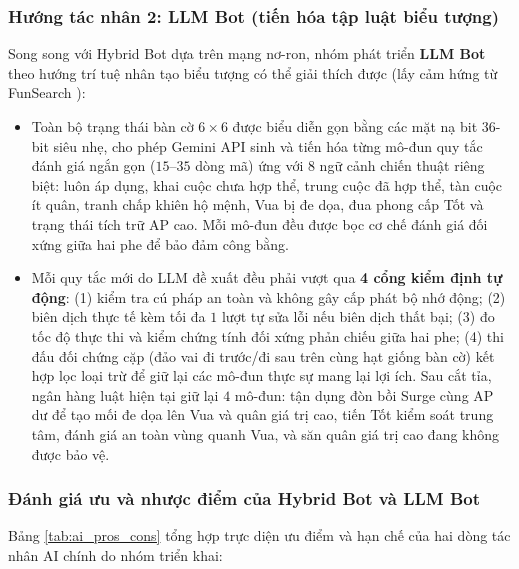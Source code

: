 \subsubsection{Hướng tác nhân 2: LLM Bot (tiến hóa tập luật biểu tượng)}
Song song với Hybrid Bot dựa trên mạng nơ-ron, nhóm phát triển \textbf{LLM Bot} theo hướng trí tuệ nhân tạo biểu tượng có thể giải thích được (lấy cảm hứng từ FunSearch \cite{funsearch}):
\begin{itemize}
    \item Toàn bộ trạng thái bàn cờ $6 \times 6$ được biểu diễn gọn bằng các mặt nạ bit $36$-bit siêu nhẹ, cho phép Gemini API sinh và tiến hóa từng mô-đun quy tắc đánh giá ngắn gọn ($15$--$35$ dòng mã) ứng với $8$ ngữ cảnh chiến thuật riêng biệt: luôn áp dụng, khai cuộc chưa hợp thể, trung cuộc đã hợp thể, tàn cuộc ít quân, tranh chấp khiên hộ mệnh, Vua bị đe dọa, đua phong cấp Tốt và trạng thái tích trữ AP cao. Mỗi mô-đun đều được bọc cơ chế đánh giá đối xứng giữa hai phe để bảo đảm công bằng.
    \item Mỗi quy tắc mới do LLM đề xuất đều phải vượt qua \textbf{4 cổng kiểm định tự động}: (1) kiểm tra cú pháp an toàn và không gây cấp phát bộ nhớ động; (2) biên dịch thực tế kèm tối đa $1$ lượt tự sửa lỗi nếu biên dịch thất bại; (3) đo tốc độ thực thi và kiểm chứng tính đối xứng phản chiếu giữa hai phe; (4) thi đấu đối chứng cặp (đảo vai đi trước/đi sau trên cùng hạt giống bàn cờ) kết hợp lọc loại trừ để giữ lại các mô-đun thực sự mang lại lợi ích. Sau cắt tỉa, ngân hàng luật hiện tại giữ lại $4$ mô-đun: tận dụng đòn bồi Surge cùng AP dư để tạo mối đe dọa lên Vua và quân giá trị cao, tiến Tốt kiểm soát trung tâm, đánh giá an toàn vùng quanh Vua, và săn quân giá trị cao đang không được bảo vệ.
\end{itemize}

\subsubsection{Đánh giá ưu và nhược điểm của Hybrid Bot và LLM Bot}
Bảng \ref{tab:ai_pros_cons} tổng hợp trực diện ưu điểm và hạn chế của hai dòng tác nhân AI chính do nhóm triển khai:

